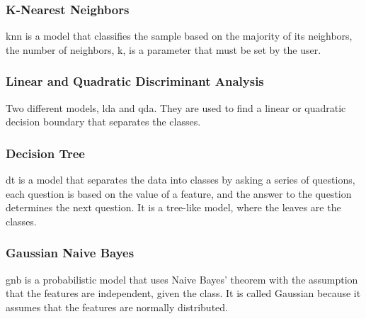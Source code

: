 \subsubsection{K-Nearest Neighbors}
\ac{knn} is a model that classifies the sample based on the majority of its neighbors, the number of neighbors, k, is a parameter that must be set by the user.

\subsubsection{Linear and Quadratic Discriminant Analysis}
Two different models, \ac{lda} and \ac{qda}. They are used to find a linear or quadratic decision boundary that separates the classes.

\subsubsection{Decision Tree}
\ac{dt} is a model that separates the data into classes by asking a series of questions, each question is based on the value of a feature, and the answer to the question determines the next question. It is a tree-like model, where the leaves are the classes.

\subsubsection{Gaussian Naive Bayes}
\ac{gnb} is a probabilistic model that uses Naive Bayes' theorem with the assumption that the features are independent, given the class. It is called Gaussian because it assumes that the features are normally distributed.
